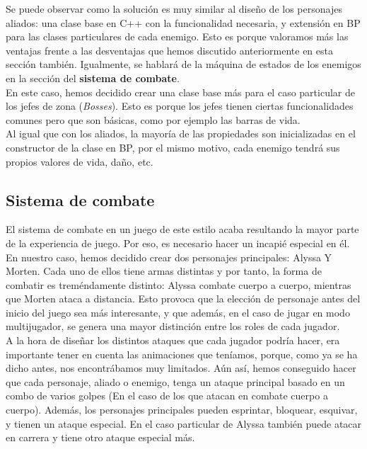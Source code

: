 Se puede observar como la solución es muy similar al diseño de los personajes aliados: una clase base en C++ con la funcionalidad necesaria, y extensión en \ac{BP} para las clases particulares de cada enemigo. Esto es porque valoramos más las ventajas frente a las desventajas que hemos discutido anteriormente en esta sección también. Igualmente, se hablará de la máquina de estados de los enemigos en la sección del \textbf{sistema de combate}.
\\

En este caso, hemos decidido crear una clase base más para el caso particular de los jefes de zona (\textit{Bosses}). Esto es porque los jefes tienen ciertas funcionalidades comunes pero que son básicas, como por ejemplo las barras de vida.
\\

Al igual que con los aliados, la mayoría de las propiedades son inicializadas en el constructor de la clase en \ac{BP}, por el mismo motivo, cada enemigo tendrá sus propios valores de vida, daño, etc.

\subsection{Sistema de combate}
El sistema de combate en un juego de este estilo acaba resultando la mayor parte de la experiencia de juego. Por eso, es necesario hacer un incapié especial en él.
En nuestro caso, hemos decidido crear dos personajes principales: Alyssa Y Morten. Cada uno de ellos tiene armas distintas y por tanto, la forma de combatir es treméndamente distinto: Alyssa combate cuerpo a cuerpo, mientras que Morten ataca a distancia. Esto provoca que la elección de personaje antes del inicio del juego sea más interesante, y que además, en el caso de jugar en modo multijugador, se genera una mayor distinción entre los roles de cada jugador. 
\\

A la hora de diseñar los distintos ataques que cada jugador podría hacer, era importante tener en cuenta las animaciones que teníamos, porque, como ya se ha dicho antes, nos encontrábamos muy limitados. Aún así, hemos conseguido hacer que cada personaje, aliado o enemigo, tenga un ataque principal basado en un combo de varios golpes (En el caso de los que atacan en combate cuerpo a cuerpo). Además, los personajes principales pueden esprintar, bloquear, esquivar, y tienen un ataque especial.
En el caso particular de Alyssa también puede atacar en carrera y tiene otro ataque especial más. 
\\

